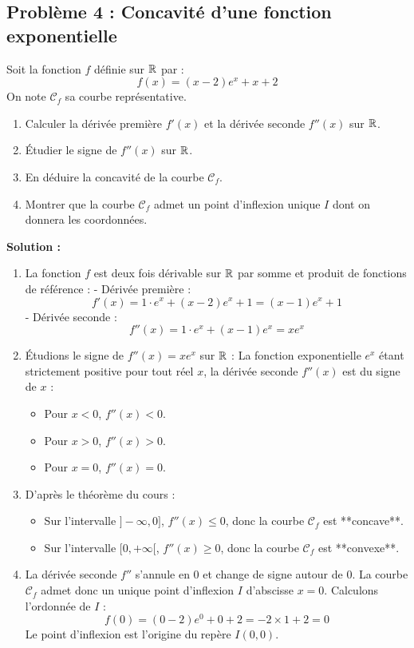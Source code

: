 \subsection*{Problème 4 : Concavité d'une fonction exponentielle}
Soit la fonction $f$ définie sur $\mathbb{R}$ par :
\[
f(x) = (x-2)e^x + x + 2
\]
On note $\mathcal{C}_f$ sa courbe représentative.
\begin{enumerate}
    \item Calculer la dérivée première $f'(x)$ et la dérivée seconde $f''(x)$ sur $\mathbb{R}$.
    \item Étudier le signe de $f''(x)$ sur $\mathbb{R}$.
    \item En déduire la concavité de la courbe $\mathcal{C}_f$.
    \item Montrer que la courbe $\mathcal{C}_f$ admet un point d'inflexion unique $I$ dont on donnera les coordonnées.
\end{enumerate}

\textbf{Solution :}
\begin{enumerate}
    \item La fonction $f$ est deux fois dérivable sur $\mathbb{R}$ par somme et produit de fonctions de référence :
      - Dérivée première :
      \[
      f'(x) = 1 \cdot e^x + (x-2)e^x + 1 = (x-1)e^x + 1
      \]
      - Dérivée seconde :
      \[
      f''(x) = 1 \cdot e^x + (x-1)e^x = x e^x
      \]
      
    \item Étudions le signe de $f''(x) = x e^x$ sur $\mathbb{R}$ :
      La fonction exponentielle $e^x$ étant strictement positive pour tout réel $x$, la dérivée seconde $f''(x)$ est du signe de $x$ :
      \begin{itemize}
          \item Pour $x < 0$, $f''(x) < 0$.
          \item Pour $x > 0$, $f''(x) > 0$.
          \item Pour $x = 0$, $f''(x) = 0$.
      \end{itemize}
      
    \item D'après le théorème du cours :
      \begin{itemize}
          \item Sur l'intervalle $]-\infty, 0]$, $f''(x) \le 0$, donc la courbe $\mathcal{C}_f$ est **concave**.
          \item Sur l'intervalle $[0, +\infty[$, $f''(x) \ge 0$, donc la courbe $\mathcal{C}_f$ est **convexe**.
      \end{itemize}
      
    \item La dérivée seconde $f''$ s'annule en 0 et change de signe autour de 0.
      La courbe $\mathcal{C}_f$ admet donc un unique point d'inflexion $I$ d'abscisse $x=0$.
      Calculons l'ordonnée de $I$ :
      \[
      f(0) = (0-2)e^0 + 0 + 2 = -2 \times 1 + 2 = 0
      \]
      Le point d'inflexion est l'origine du repère $I(0, 0)$.
\end{enumerate}

